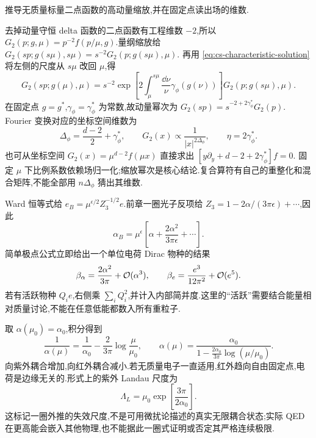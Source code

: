 \begin{example}
推导无质量标量二点函数的高动量缩放,并在固定点读出场的维数.
\end{example}
\begin{solution}
去掉动量守恒 delta 函数的二点函数有工程维数 $-2$,所以
$G_2(p;g,\mu)=p^{-2}f(p/\mu,g)$.量纲缩放给
$G_2(sp;g(s\mu),s\mu)=s^{-2}G_2(p;g(s\mu),\mu)$.
再用 \eqref{eq:cs-characteristic-solution} 将左侧的尺度从 $s\mu$ 改回 $\mu$,得
\begin{equation}
 G_2(sp;g(\mu),\mu)=s^{-2}
 \exp\left[2\int_\mu^{s\mu}\frac{\dd\nu}\nu\gamma_\phi(g(\nu))\right]
 G_2(p;g(s\mu),\mu).
 \label{eq:cs-two-point-momentum-scaling}
\end{equation}
在固定点 $g=g^*$,$\gamma_\phi=\gamma_\phi^*$ 为常数,故动量幂次为
$G_2(sp)=s^{-2+2\gamma_\phi^*}G_2(p)$.
Fourier 变换对应的坐标空间维数为
\begin{equation}
 \Delta_\phi=\frac{d-2}{2}+\gamma_\phi^*,\qquad
 G_2(x)\propto\frac1{|x|^{2\Delta_\phi}},\qquad
 \eta=2\gamma_\phi^*.
 \label{eq:cs-fixed-point-dimension}
\end{equation}
也可从坐标空间
$G_2(x)=\mu^{d-2}f(\mu x)$ 直接求出
$[y\partial_y+d-2+2\gamma_\phi^*]f=0$.
固定 $\mu$ 下比例系数依赖场归一化;缩放幂次是核心结论.复合算符有自己的重整化和混合矩阵,不能全部用 $n\Delta_\phi$ 猜出其维数.
\end{solution}


Ward 恒等式给 $e_B=\mu^{\epsilon/2}Z_3^{-1/2}e$.前章一圈光子反项给
$Z_3=1-2\alpha/(3\pi\epsilon)+\cdots$,因此
\begin{equation}
 \alpha_B=\mu^\epsilon\left[\alpha+
              \frac{2\alpha^2}{3\pi\epsilon}+\cdots\right].
\end{equation}
简单极点公式立即给出一个单位电荷 Dirac 物种的结果
\begin{equation}
 \beta_\alpha=\frac{2\alpha^2}{3\pi}+\mathcal O(\alpha^3),\qquad
 \beta_e=\frac{e^3}{12\pi^2}+\mathcal O(e^5).
 \label{eq:qed-beta-one-loop}
\end{equation}
若有活跃物种 $Q_i e$,右侧乘 $\sum_iQ_i^2$,并计入内部简并度.这里的“活跃”需要结合能量相对质量讨论,不能在任意低能都数入所有重粒子.

取 $\alpha(\mu_0)=\alpha_0$,积分得到
\begin{equation}
 \frac1{\alpha(\mu)}=\frac1{\alpha_0}-\frac2{3\pi}\log\frac\mu{\mu_0},\qquad
 \alpha(\mu)=\frac{\alpha_0}{1-\tfrac{2\alpha_0}{3\pi}\log(\mu/\mu_0)}.
 \label{eq:qed-running-alpha}
\end{equation}
向紫外耦合增加,向红外耦合减小.若无质量电子一直适用,红外趋向自由固定点,电荷是边缘无关的.形式上的紫外 Landau 尺度为
\begin{equation}
 \Lambda_L=\mu_0\exp\left[\frac{3\pi}{2\alpha_0}\right].
\end{equation}
这标记一圈外推的失效尺度,不是可用微扰论描述的真实无限耦合状态;实际 QED 在更高能会嵌入其他物理,也不能据此一圈式证明或否定其严格连续极限.

